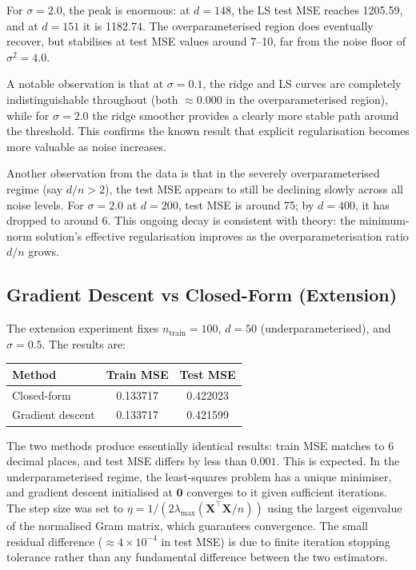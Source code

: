 \documentclass[11pt,a4paper]{article}
\begin{document}
For $\sigma = 2.0$, the peak is enormous: at $d = 148$, the LS test MSE reaches 1205.59, and at $d = 151$ it is 1182.74. The overparameterised region does eventually recover, but stabilises at test MSE values around 7--10, far from the noise floor of $\sigma^2 = 4.0$.

A notable observation is that at $\sigma = 0.1$, the ridge and LS curves are completely indistinguishable throughout (both $\approx 0.000$ in the overparameterised region), while for $\sigma = 2.0$ the ridge smoother provides a clearly more stable path around the threshold. This confirms the known result that explicit regularisation becomes more valuable as noise increases.

Another observation from the data is that in the severely overparameterised regime (say $d/n > 2$), the test MSE appears to still be declining slowly across all noise levels. For $\sigma = 2.0$ at $d = 200$, test MSE is around 75; by $d = 400$, it has dropped to around 6. This ongoing decay is consistent with theory: the minimum-norm solution's effective regularisation improves as the overparameterisation ratio $d/n$ grows.

\subsection{Gradient Descent vs Closed-Form (Extension)}

The extension experiment fixes $n_{\text{train}} = 100$, $d = 50$ (underparameterised), and $\sigma = 0.5$. The results are:

\begin{center}
\begin{tabular}{lcc}
\toprule
Method & Train MSE & Test MSE \\
\midrule
Closed-form & 0.133717 & 0.422023 \\
Gradient descent & 0.133717 & 0.421599 \\
\bottomrule
\end{tabular}
\end{center}

The two methods produce essentially identical results: train MSE matches to 6 decimal places, and test MSE differs by less than $0.001$. This is expected. In the underparameterised regime, the least-squares problem has a unique minimiser, and gradient descent initialised at $\mathbf{0}$ converges to it given sufficient iterations. The step size was set to $\eta = 1 / (2 \lambda_{\max}(\mathbf{X}^\top\mathbf{X}/n))$ using the largest eigenvalue of the normalised Gram matrix, which guarantees convergence. The small residual difference ($\approx 4 \times 10^{-4}$ in test MSE) is due to finite iteration stopping tolerance rather than any fundamental difference between the two estimators.
\end{document}
